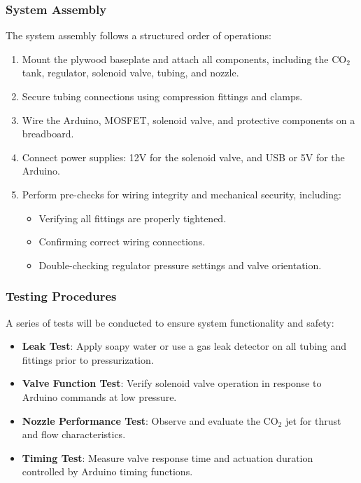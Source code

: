\documentclass{new-aiaa}
\begin{document}
\subsubsection{System Assembly}
The system assembly follows a structured order of operations:
\begin{enumerate}
    \item Mount the plywood baseplate and attach all components, including the CO$_2$ tank, regulator, solenoid valve, tubing, and nozzle.
    \item Secure tubing connections using compression fittings and clamps.
    \item Wire the Arduino, MOSFET, solenoid valve, and protective components on a breadboard.
    \item Connect power supplies: 12V for the solenoid valve, and USB or 5V for the Arduino.
    \item Perform pre-checks for wiring integrity and mechanical security, including:
    \begin{itemize}
        \item Verifying all fittings are properly tightened.
        \item Confirming correct wiring connections.
        \item Double-checking regulator pressure settings and valve orientation.
    \end{itemize}
\end{enumerate}

\subsubsection{Testing Procedures}
A series of tests will be conducted to ensure system functionality and safety:
\begin{itemize}
    \item \textbf{Leak Test}: Apply soapy water or use a gas leak detector on all tubing and fittings prior to pressurization.
    \item \textbf{Valve Function Test}: Verify solenoid valve operation in response to Arduino commands at low pressure.
    \item \textbf{Nozzle Performance Test}: Observe and evaluate the CO$_2$ jet for thrust and flow characteristics.
    \item \textbf{Timing Test}: Measure valve response time and actuation duration controlled by Arduino timing functions.
\end{itemize}
\end{document}
